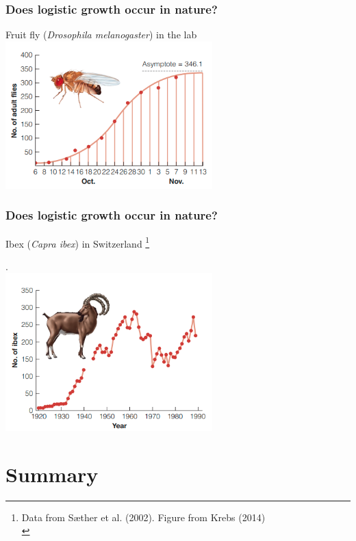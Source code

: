 \documentclass[color=usenames,dvipsnames]{beamer}\usepackage[]{graphicx}\usepackage[]{xcolor}
\newcommand\blfootnote[1]{%
  \begingroup
  \renewcommand\thefootnote{}\footnote{#1}%
  \addtocounter{footnote}{-1}%
  \endgroup
}
\begin{document}
\begin{frame}
  \frametitle{Does logistic growth occur in nature?}
  \pause
  Fruit fly ({\it Drosophila melanogaster}) in the lab
  \vfill
  \centering
  \includegraphics[width=0.6\textwidth]{figs/logistic-drosophila}
\end{frame}





\begin{frame}
  \frametitle{Does logistic growth occur in nature?}
  Ibex ({\it Capra ibex}) in Switzerland\blfootnote{\tiny
    \flushleft
    Data from S{\ae}ther et al. (2002). Figure from Krebs (2014) \\
  }. \\
  \vfill
  \centering
  \includegraphics[width=0.6\textwidth]{figs/logistic-ibex}\\
\end{frame}





\section{Summary}
\end{document}

